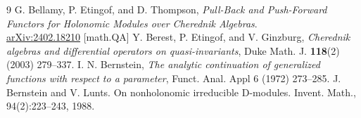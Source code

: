 \documentclass[12pt, a4paper]{amsart}
\begin{document}
\begin{thebibliography}{9}
{\sc G. Bellamy, P. Etingof, and D. Thompson},
{\em Pull-Back and Push-Forward Functors for Holonomic Modules over Cherednik Algebras}.\\
\href{https://arxiv.org/abs/2402.18210}{arXiv:2402.18210} [math.QA]
{\sc Y. Berest, P. Etingof, and V. Ginzburg}, {\em Cherednik algebras and differential operators on quasi-invariants},
Duke Math. J. {\bf 118}(2) (2003) 279--337.
{\sc I. N. Bernstein},
{\em The analytic continuation of generalized functions with respect to a parameter},
Funct. Anal. Appl 6 (1972) 273--285.
 J. Bernstein and V. Lunts. On nonholonomic irreducible D-modules. Invent. Math., 94(2):223–243, 1988.

\end{thebibliography}
\end{document}
